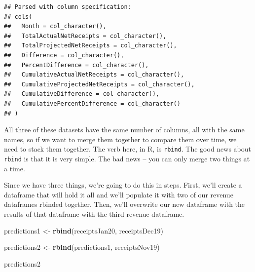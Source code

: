 \documentclass[]{book}
\newenvironment{Shaded}{\begin{snugshade}}{\end{snugshade}}
\newcommand{\CharTok}[1]{\textcolor[rgb]{0.31,0.60,0.02}{#1}}
\newcommand{\DataTypeTok}[1]{\textcolor[rgb]{0.13,0.29,0.53}{#1}}
\newcommand{\KeywordTok}[1]{\textcolor[rgb]{0.13,0.29,0.53}{\textbf{#1}}}
\newcommand{\NormalTok}[1]{#1}
\newcommand{\OperatorTok}[1]{\textcolor[rgb]{0.81,0.36,0.00}{\textbf{#1}}}
\newcommand{\StringTok}[1]{\textcolor[rgb]{0.31,0.60,0.02}{#1}}
\begin{document}
\begin{Shaded}
\begin{Highlighting}[]
{{  \DataTypeTok{CumulativeProjectedNetReceipts =} \KeywordTok{gsub}\NormalTok{(}\StringTok{"}\CharTok{\textbackslash{}\textbackslash{}}\StringTok{$"}\NormalTok{,}\StringTok{""}\NormalTok{,CumulativeProjectedNetReceipts),}
  \DataTypeTok{CumulativeDifference =} \KeywordTok{gsub}\NormalTok{(}\StringTok{","}\NormalTok{,}\StringTok{""}\NormalTok{,CumulativeDifference),}
  \DataTypeTok{CumulativeDifference =} \KeywordTok{gsub}\NormalTok{(}\StringTok{"}\CharTok{\textbackslash{}\textbackslash{}}\StringTok{$"}\NormalTok{,}\StringTok{""}\NormalTok{,CumulativeDifference),}
  \DataTypeTok{CumulativePercentDifference =} \KeywordTok{gsub}\NormalTok{(}\StringTok{"}\CharTok{\textbackslash{}\textbackslash{}}\StringTok{%
\NormalTok{  ) }\OperatorTok{%
\end{Highlighting}
\end{Shaded}

\begin{verbatim}
## Parsed with column specification:
## cols(
##   Month = col_character(),
##   TotalActualNetReceipts = col_character(),
##   TotalProjectedNetReceipts = col_character(),
##   Difference = col_character(),
##   PercentDifference = col_character(),
##   CumulativeActualNetReceipts = col_character(),
##   CumulativeProjectedNetReceipts = col_character(),
##   CumulativeDifference = col_character(),
##   CumulativePercentDifference = col_character()
## )
\end{verbatim}

All three of these datasets have the same number of columns, all with the same names, so if we want to merge them together to compare them over time, we need to stack them together. The verb here, in R, is \texttt{rbind}. The good news about \texttt{rbind} is that it is very simple. The bad news -- you can only merge two things at a time.

Since we have three things, we're going to do this in steps. First, we'll create a dataframe that will hold it all and we'll populate it with two of our revenue dataframes rbinded together. Then, we'll overwrite our new dataframe with the results of that dataframe with the third revenue dataframe.

\begin{Shaded}
\begin{Highlighting}[]
\NormalTok{predictions1 <-}\StringTok{ }\KeywordTok{rbind}\NormalTok{(receiptsJan20, receiptsDec19)}

\NormalTok{predictions2 <-}\StringTok{ }\KeywordTok{rbind}\NormalTok{(predictions1, receiptsNov19)}

\NormalTok{predictions2}
\end{Highlighting}
\end{Shaded}
\end{document}
